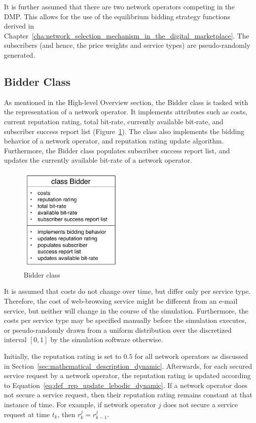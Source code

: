 It is further assumed that there are two network operators competing in the DMP. This allows for the use of the equilibrium bidding strategy functions derived in Chapter~\ref{cha:network_selection_mechanism_in_the_digital_marketplace}. The subscribers (and  hence, the price weights and service types) are pseudo-randomly generated.

\subsection{Bidder Class}
\label{sub:bidder_class_dmappendix}
As mentioned in the High-level Overview section, the Bidder class is tasked with the representation of a network operator. It implements attributes such as costs, current reputation rating, total bit-rate, currently available bit-rate, and subscriber success report list (Figure~\ref{fig:bidder_class_dmappendix}). The class also implements the bidding behavior of a network operator, and reputation rating update algorithm. Furthermore, the Bidder class populates subscriber success report list, and updates the currently available bit-rate of a network operator.

\begin{figure}[t]
	\includegraphics[width=2in]{Appendices/Figures/bidder_class}
	\caption{Bidder class}
	\label{fig:bidder_class_dmappendix}
\end{figure}

It is assumed that costs do not change over time, but differ only per service type. Therefore, the cost of web-browsing service might be different from an e-mail service, but neither will change in the course of the simulation. Furthermore, the costs per service type may be specified manually before the simulation executes, or pseudo-randomly drawn from a uniform distribution over the discretized interval $[0,1]$ by the simulation software otherwise.

Initially, the reputation rating is set to $0.5$ for all network operators as discussed in Section~\ref{sec:mathematical_description_dynamic}. Afterwards, for each secured service request by a network operator, the reputation rating is updated according to Equation~\eqref{eq:def_rep_update_lebodic_dynamic}. If a network operator does not secure a service request, then their reputation rating remains constant at that instance of time. For example, if network operator $j$ does not secure a service request at time $t_k$, then $r^j_k = r^j_{k-1}$.

